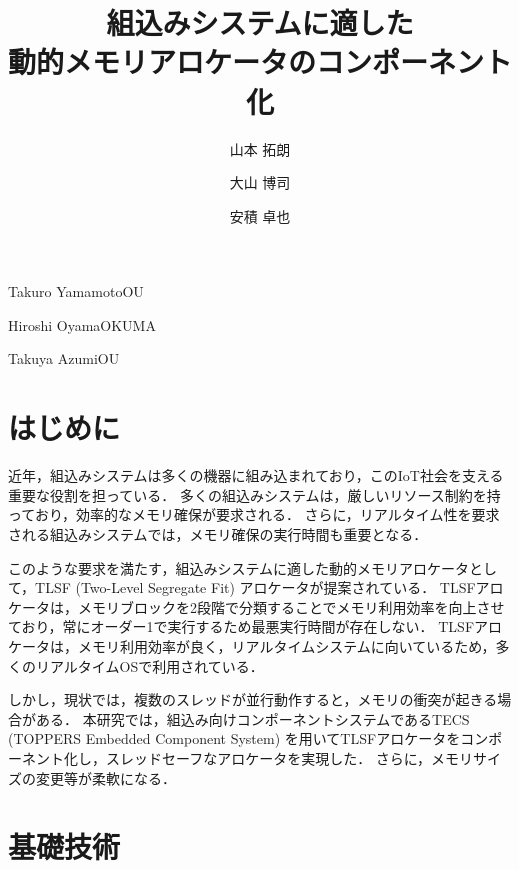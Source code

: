 \documentclass[submit]{ipsj_v2/UTF8/ipsj}
\begin{document}
\title{組込みシステムに適した\\動的メモリアロケータのコンポーネント化}




\author{山本 拓朗}{Takuro Yamamoto}{OU}%
\author{大山 博司}{Hiroshi Oyama}{OKUMA}%
\author{安積 卓也}{Takuya Azumi}{OU}%

\maketitle

\section{はじめに}
近年，組込みシステムは多くの機器に組み込まれており，このIoT社会を支える重要な役割を担っている．
多くの組込みシステムは，厳しいリソース制約を持っており，効率的なメモリ確保が要求される．
さらに，リアルタイム性を要求される組込みシステムでは，メモリ確保の実行時間も重要となる．

このような要求を満たす，組込みシステムに適した動的メモリアロケータとして，TLSF (Two-Level Segregate Fit) アロケータが提案されている．
TLSFアロケータは，メモリブロックを2段階で分類することでメモリ利用効率を向上させており，常にオーダー1で実行するため最悪実行時間が存在しない．
TLSFアロケータは，メモリ利用効率が良く，リアルタイムシステムに向いているため，多くのリアルタイムOSで利用されている．

しかし，現状では，複数のスレッドが並行動作すると，メモリの衝突が起きる場合がある．
本研究では，組込み向けコンポーネントシステムであるTECS (TOPPERS Embedded Component System) を用いてTLSFアロケータをコンポーネント化し，スレッドセーフなアロケータを実現した．
さらに，メモリサイズの変更等が柔軟になる．

%

\section{基礎技術}
\label{sec:Background}
\end{document}
